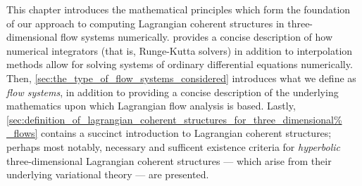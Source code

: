 This chapter introduces the mathematical principles which form the foundation
of our approach to computing Lagrangian coherent structures in
three-dimensional flow systems numerically.
 provides a
concise description of how numerical integrators (that is, Runge-Kutta
solvers) in addition to interpolation methods allow for solving systems
of ordinary differential equations numerically. Then,
\cref{sec:the_type_of_flow_systems_considered} introduces what we define as
\emph{flow systems}, in addition to providing a concise description of the
underlying mathematics upon which Lagrangian flow analysis is based. Lastly,
\cref{sec:definition_of_lagrangian_coherent_structures_for_three_dimensional%
_flows} contains a succinct introduction to Lagrangian coherent structures;
perhaps most notably, necessary and sufficent existence criteria for
\emph{hyperbolic} three-dimensional Lagrangian coherent structures --- which
arise from their underlying variational theory --- are presented.
